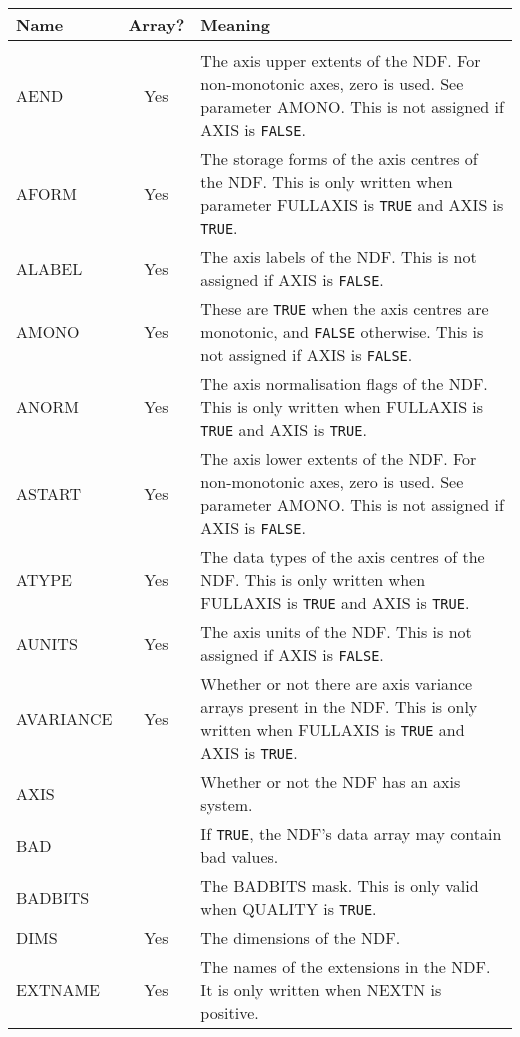 \newpage
\begin{center}
\begin{tabular}{lcp{112mm}}
Name & Array? & Meaning \\ \hline
\\
AEND & Yes & The axis upper extents of the NDF.  For non-monotonic axes,
             zero is used.  See parameter AMONO.  This is not assigned if
             AXIS is {\tt FALSE}. \\
AFORM & Yes & The storage forms of the axis centres of the NDF.  This is
              only written when parameter FULLAXIS is {\tt TRUE} and AXIS
              is {\tt TRUE}. \\
ALABEL & Yes & The axis labels of the NDF.  This is not assigned if AXIS is
               {\tt FALSE}. \\
AMONO & Yes &  These are {\tt TRUE} when the axis centres are monotonic, and {\tt FALSE}
               otherwise.  This is not assigned if AXIS is {\tt FALSE}. \\
ANORM & Yes &  The axis normalisation flags of the NDF.  This is only written
               when FULLAXIS is {\tt TRUE} and AXIS is {\tt TRUE}. \\
ASTART & Yes &  The axis lower extents of the NDF.  For non-monotonic axes,
                zero is used.  See parameter AMONO.  This is not assigned if
                AXIS is {\tt FALSE}. \\
ATYPE & Yes & The data types of the axis centres of the NDF.  This is only
              written when FULLAXIS is {\tt TRUE} and AXIS is {\tt TRUE}. \\
AUNITS & Yes & The axis units of the NDF.  This is not assigned if AXIS is
               {\tt FALSE}. \\
AVARIANCE & Yes & Whether or not there are axis variance arrays present in the
                  NDF.  This is only written when FULLAXIS is {\tt TRUE} and AXIS is
                  {\tt TRUE}.\\
AXIS & & Whether or not the NDF has an axis system. \\
BAD & & If {\tt TRUE}, the NDF's data array may contain bad values. \\
BADBITS & & The BADBITS mask.  This is only valid when QUALITY is {\tt TRUE}. \\
DIMS & Yes & The dimensions of the NDF. \\
EXTNAME & Yes & The names of the extensions in the NDF.  It is only written
                when NEXTN is positive. \\

\end{tabular}
\end{center}

